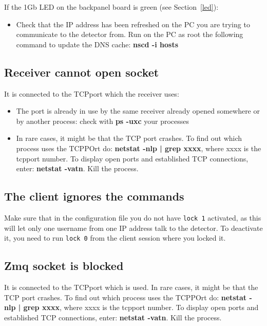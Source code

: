 \documentclass{article}
\begin{document}
If the 1Gb LED on the backpanel board is green (see Section~\ref{led}):
\begin{itemize}
\item Check that the IP address has been refreshed on the PC you are trying to communicate to the detector from. Run on the PC as root the following command to update the DNS cache: \textbf{nscd -i hosts} 
\end{itemize}

\subsection{Receiver cannot open socket}
It is connected to the TCPport which the receiver uses:
\begin{itemize}
\item The port is already in use by the same receiver already opened somewhere or by another process: check with \textbf{ps -uxc} your processes
\item In rare cases, it might be that the TCP port crashes. To find out which process uses the TCPPOrt do: \textbf{netstat -nlp | grep xxxx}, where xxxx is the tcpport number. To display open ports and established TCP connections, enter: \textbf{netstat -vatn}. Kill the process.
 \end{itemize}

\subsection{The client ignores the commands}
Make sure that in the configuration file you do not have {\tt{lock 1}} activated, as this will let only one username from one IP address talk to the detector. 
To deactivate it, you need to run {\tt{lock 0}} from the client session where you locked it. 

\subsection{Zmq socket is blocked}
It is connected to the TCPport which is used. In rare cases, it might be that the TCP port crashes. To find out which process uses the TCPPOrt do: \textbf{netstat -nlp | grep xxxx}, where xxxx is the tcpport number. To display open ports and established TCP connections, enter: \textbf{netstat -vatn}. Kill the process.
\end{document}
